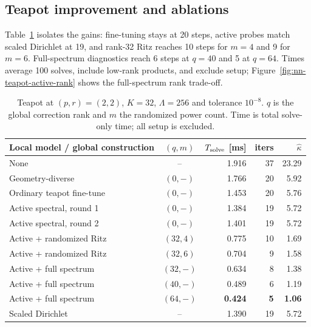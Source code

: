 \documentclass{article}
\theoremstyle{plain}
\numberwithin{equation}{section}
\begin{document}
\subsection{Teapot improvement and ablations}

Table~\ref{tab:nn-teapot-active} isolates the gains: fine-tuning stays at 20
steps, active probes match scaled Dirichlet at 19, and rank-32 Ritz reaches
10 steps for $m=4$ and 9 for $m=6$.  Full-spectrum diagnostics reach 6 steps
at $q=40$ and 5 at $q=64$.  Times average 100 solves, include low-rank
products, and exclude setup; Figure~\ref{fig:nn-teapot-active-rank} shows the
full-spectrum rank trade-off.

\begin{table}[ht]
    \centering
    \caption{Teapot at $(p,r)=(2,2)$, $K=32$, $\Lambda=256$ and tolerance
        $10^{-8}$.  $q$ is the global correction rank and $m$ the randomized power
        count.  Time is total solve-only time; all setup is excluded.}
    \label{tab:nn-teapot-active}
    \small
    \begin{tabular}{lcrrr}
        \toprule
        Local model / global construction & $(q,m)$    & $T_{\rm solve}$ [ms] & iters      & $\widehat\kappa$ \\
        \midrule
        None                              & --         & 1.916                & 37         & 23.29            \\
        Geometry-diverse                  & $(0,{-})$  & 1.766                & 20         & 5.92             \\
        Ordinary teapot fine-tune         & $(0,{-})$  & 1.453                & 20         & 5.76             \\
        Active spectral, round 1          & $(0,{-})$  & 1.384                & 19         & 5.72             \\
        Active spectral, round 2          & $(0,{-})$  & 1.401                & 19         & 5.72             \\
        Active + randomized Ritz          & $(32,4)$   & 0.775                & 10         & 1.69             \\
        Active + randomized Ritz          & $(32,6)$   & 0.704                & 9          & 1.58             \\
        Active + full spectrum            & $(32,{-})$ & 0.634                & 8          & 1.38             \\
        Active + full spectrum            & $(40,{-})$ & 0.489                & 6          & 1.19             \\
        Active + full spectrum            & $(64,{-})$ & \textbf{0.424}       & \textbf{5} & \textbf{1.06}    \\
        Scaled Dirichlet                  & --         & 1.390                & 19         & 5.72             \\
        \bottomrule
    \end{tabular}
\end{table}
\end{document}
